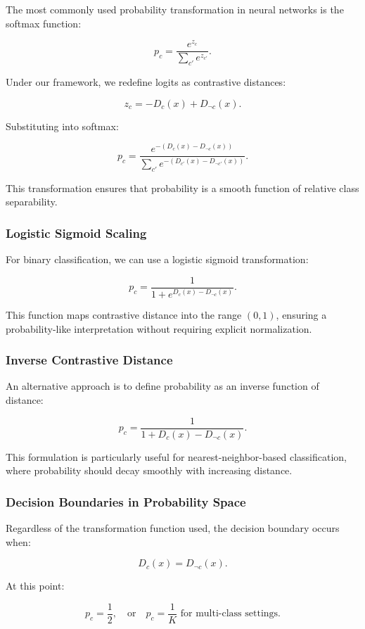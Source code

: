The most commonly used probability transformation in neural networks is the softmax function:

\[
p_c = \frac{e^{z_c}}{\sum_{c'} e^{z_{c'}}}.
\]

Under our framework, we redefine logits as contrastive distances:

\[
z_c = -D_c(x) + D_{\neg c}(x).
\]

Substituting into softmax:

\[
p_c = \frac{e^{-(D_c(x) - D_{\neg c}(x))}}{\sum_{c'} e^{-(D_{c'}(x) - D_{\neg c'}(x))}}.
\]

This transformation ensures that probability is a smooth function of relative class separability.

\subsubsection{Logistic Sigmoid Scaling}

For binary classification, we can use a logistic sigmoid transformation:

\[
p_c = \frac{1}{1 + e^{D_c(x) - D_{\neg c}(x)}}.
\]

This function maps contrastive distance into the range \( (0,1) \), ensuring a probability-like interpretation without requiring explicit normalization.

\subsubsection{Inverse Contrastive Distance}

An alternative approach is to define probability as an inverse function of distance:

\[
p_c = \frac{1}{1 + D_c(x) - D_{\neg c}(x)}.
\]

This formulation is particularly useful for nearest-neighbor-based classification, where probability should decay smoothly with increasing distance.

\subsubsection{Decision Boundaries in Probability Space}

Regardless of the transformation function used, the decision boundary occurs when:

\[
D_c(x) = D_{\neg c}(x).
\]

At this point:

\[
p_c = \frac{1}{2}, \quad \text{or} \quad p_c = \frac{1}{K} \text{ for multi-class settings}.
\]

